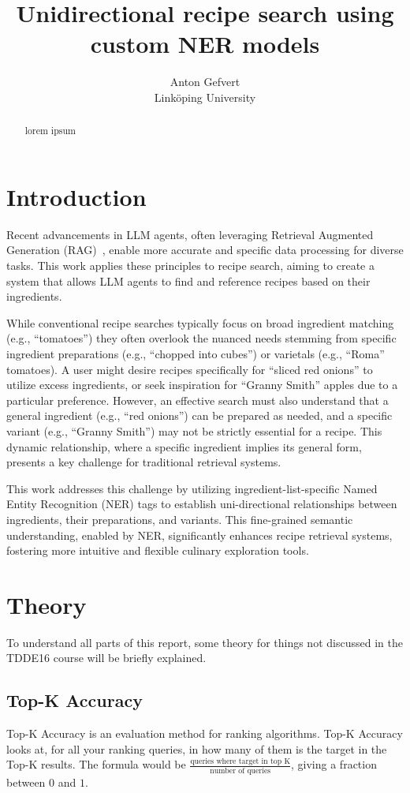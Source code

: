 \documentclass[11pt]{article}
\title{Unidirectional recipe search using custom NER models}
\date{}
\author{Anton Gefvert \\ Linköping University}
\begin{document}
\maketitle
\begin{abstract}
    lorem ipsum
\end{abstract}
\section{Introduction}
Recent advancements in LLM agents, often leveraging Retrieval Augmented
Generation (RAG)~\cite{RAG}, enable more accurate and specific data processing
for diverse tasks.
This work applies these principles to recipe search, aiming to create a system
that allows LLM agents to find and reference recipes based on their
ingredients.

While conventional recipe searches typically focus on broad ingredient matching
(e.g., ``tomatoes'') they often overlook the nuanced needs stemming from
specific ingredient preparations (e.g., ``chopped into cubes'') or varietals
(e.g., ``Roma'' tomatoes).
A user might desire recipes specifically for ``sliced red onions'' to utilize
excess ingredients, or seek inspiration for ``Granny Smith'' apples due to a
particular preference.
However, an effective search must also understand that a general ingredient
(e.g., ``red onions'') can be prepared as needed, and a specific variant (e.g.,
``Granny Smith'') may not be strictly essential for a recipe.
This dynamic relationship, where a specific ingredient implies its general form,
presents a key challenge for traditional retrieval systems.

This work addresses this challenge by utilizing ingredient-list-specific Named
Entity Recognition (NER) tags to establish uni-directional relationships
between ingredients, their preparations, and variants.
This fine-grained semantic understanding, enabled by NER, significantly
enhances recipe retrieval systems, fostering more intuitive and flexible
culinary exploration tools.

\section{Theory}
To understand all parts of this report, some theory for things not discussed in
the TDDE16 course will be briefly explained.
\subsection{Top-K Accuracy}
Top-K Accuracy is an evaluation method for ranking algorithms.
Top-K Accuracy looks at, for all your ranking queries, in how many of them is the
target in the Top-K results.
The formula would be $\frac{\text{queries where target in top K}}{\text{number of
queries}}$, giving a fraction between $0$ and $1$\cite{topkacc}.
\end{document}
